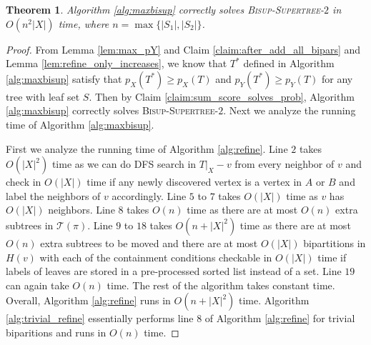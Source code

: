 \documentclass{bmcart}
\newcommand{\bisuptwo}{\textsc{Bisup-Supertree-$2$}\xspace}
\newtheorem{theorem}{Theorem}
\begin{document}
\begin{theorem}\label{thm:correctness_alg}
Algorithm \ref{alg:maxbisup} correctly solves \bisuptwo in $O(n^2|X|)$ time, where $n=\max\{|S_1|,|S_2|\}$.
\end{theorem}
\begin{proof}
From Lemma \ref{lem:max_pY} and Claim \ref{claim:after_add_all_bipars} and Lemma \ref{lem:refine_only_increases}, we know that $T^*$ defined in Algorithm \ref{alg:maxbisup} satisfy that $p_X(T^*) \ge p_X(T)$ and $p_Y(T^*) \ge p_Y(T)$ for any tree with leaf set $S$. Then by Claim \ref{claim:sum_score_solves_prob}, Algorithm \ref{alg:maxbisup} correctly solves \bisuptwo. Next we analyze the running time of Algorithm \ref{alg:maxbisup}.\smallskip

First we analyze the running time of Algorithm \ref{alg:refine}. Line $2$ takes $O(|X|^2)$ time as we can do DFS search in $T|_X - v$ from every neighbor of $v$ and check in $O(|X|)$ time if any newly discovered vertex is a vertex in $A$ or $B$ and label the neighbors of $v$ accordingly. Line $5$ to $7$ takes $O(|X|)$ time as $v$ has $O(|X|)$ neighbors. Line $8$ takes $O(n)$ time as there are at most $O(n)$ extra subtrees in $\mathcal{T}(\pi)$. Line $9$ to $18$ takes $O(n+|X|^2 )$ time as there are at most $O(n)$ extra subtrees to be moved and there are at most $O(|X|)$ bipartitions in $H(v)$ with each of the containment conditions checkable in $O(|X|)$ time if labels of leaves are stored in a pre-processed sorted list instead of a set. Line $19$ can again take $O(n)$ time. The rest of the algorithm takes constant time. Overall, Algorithm \ref{alg:refine} runs in $O(n + |X|^2)$ time. Algorithm \ref{alg:trivial_refine} essentially performs line $8$ of Algorithm \ref{alg:refine} for trivial biparitions and runs in $O(n)$ time.\smallskip


\end{proof}
\end{document}
